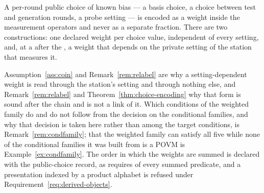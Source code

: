 
A per-round public choice of known bias --- a basis choice, a choice between
test and generation rounds, a probe setting --- is encoded as a weight inside
the measurement operators and never as a separate fraction. There are two
constructions: one declared weight per choice value, independent of every
setting, and, at a  after the , a weight
that depends on the private setting of the station that measures it.

Assumption~\ref{ass:coin} and Remark~\ref{rem:relabel} are why a
setting-dependent weight is read through the station's setting and through
nothing else, and Remark~\ref{rem:relabel} and Theorem~\ref{thm:choice-encoding} why
that form is sound after the chain and is not a link of it. Which conditions
of the weighted family do and do not follow from the decision on the
conditional families, and why that decision is taken here rather than among
the target conditions, is Remark~\ref{rem:condfamily}; that the weighted
family can satisfy all five while none of the conditional families it was
built from is a POVM is Example~\ref{ex:condfamily}. The order in which the
weights are summed is declared with the public-choice record, as
 requires of every summed predicate, and
a presentation indexed by a product alphabet is refused under
Requirement~\ref{req:derived-objects}.

